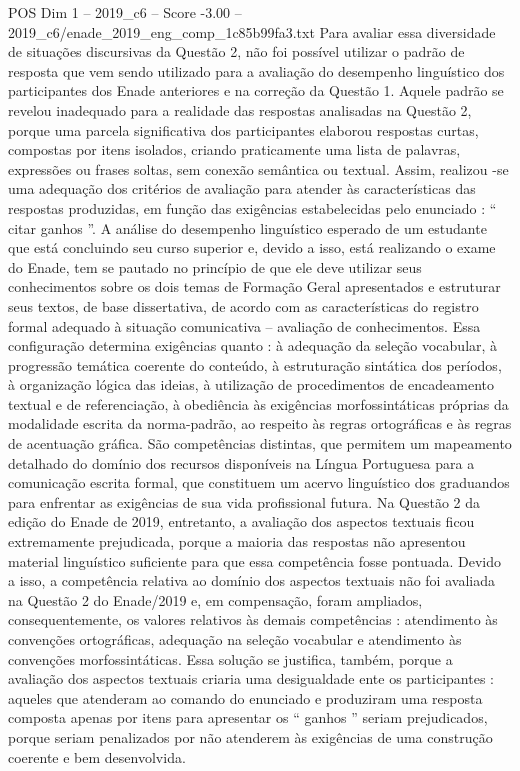 \begin{textsample}{POS Dim 1 – 2019\_c6 – Score -3.00 – 2019\_c6/enade\_2019\_eng\_comp\_1c85b99fa3.txt}
Para avaliar essa diversidade de situações discursivas da Questão 2, não foi possível utilizar o padrão de resposta que vem sendo utilizado para a avaliação do desempenho linguístico dos participantes dos Enade anteriores e na correção da Questão 1.
Aquele padrão se revelou inadequado para a realidade das respostas analisadas na Questão 2, porque uma parcela significativa dos participantes elaborou respostas curtas, compostas por itens isolados, criando praticamente uma lista de palavras, expressões ou frases soltas, sem conexão semântica ou textual.
Assim, realizou -se uma adequação dos critérios de avaliação para atender às características das respostas produzidas, em função das exigências estabelecidas pelo enunciado : “ citar ganhos ”.
A análise do desempenho linguístico esperado de um estudante que está concluindo seu curso superior e, devido a isso, está realizando o exame do Enade, tem se pautado no princípio de que ele deve utilizar seus conhecimentos sobre os dois temas de Formação Geral apresentados e estruturar seus textos, de base dissertativa, de acordo com as características do registro formal adequado à situação comunicativa – avaliação de conhecimentos.
Essa configuração determina exigências quanto : à adequação da seleção vocabular, à progressão temática coerente do conteúdo, à estruturação sintática dos períodos, à organização lógica das ideias, à utilização de procedimentos de encadeamento textual e de referenciação, à obediência às exigências morfossintáticas próprias da modalidade escrita da norma-padrão, ao respeito às regras ortográficas e às regras de acentuação gráfica.
São competências distintas, que permitem um mapeamento detalhado do domínio dos recursos disponíveis na Língua Portuguesa para a comunicação escrita formal, que constituem um acervo linguístico dos graduandos para enfrentar as exigências de sua vida profissional futura.
Na Questão 2 da edição do Enade de 2019, entretanto, a avaliação dos aspectos textuais ficou extremamente prejudicada, porque a maioria das respostas não apresentou material linguístico suficiente para que essa competência fosse pontuada.
Devido a isso, a competência relativa ao domínio dos aspectos textuais não foi avaliada na Questão 2 do Enade/2019 e, em compensação, foram ampliados, consequentemente, os valores relativos às demais competências : atendimento às convenções ortográficas, adequação na seleção vocabular e atendimento às convenções morfossintáticas.
Essa solução se justifica, também, porque a avaliação dos aspectos textuais criaria uma desigualdade ente os participantes : aqueles que atenderam ao comando do enunciado e produziram uma resposta composta apenas por itens para apresentar os “ ganhos ” seriam prejudicados, porque seriam penalizados por não atenderem às exigências de uma construção coerente e bem desenvolvida.

\end{textsample}

